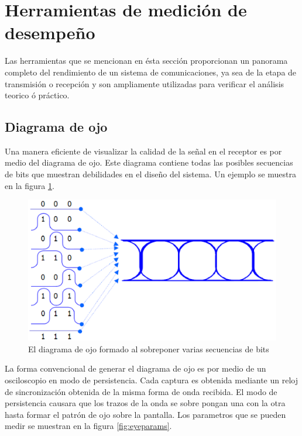 \section{Herramientas de medici\'on de desempe\~no}
Las herramientas que se mencionan en \'esta secci\'on proporcionan un panorama completo del
rendimiento de un sistema de comunicaciones, ya sea de la etapa de transmisi\'on o recepci\'on y
son ampliamente utilizadas para verificar el an\'alisis teorico \'o pr\'actico.

\subsection{Diagrama de ojo}
Una manera eficiente de visualizar la calidad de la se\~nal en el receptor es por medio del diagrama
de ojo. Este diagrama contiene todas las posibles secuencias de bits que muestran debilidades en el
dise\~no del sistema. Un ejemplo se muestra en la figura \ref{fig:eyeform}\cite{foster}.

\begin{figure}[htp]
\centering
	\includegraphics[width=5.5in]{figs/eyeform}
	\caption{El diagrama de ojo formado al sobreponer varias secuencias de bits}
	\label{fig:eyeform}
\end{figure}

La forma convencional de generar el diagrama de ojo es por medio de un osciloscopio en modo de
persistencia. Cada captura es obtenida mediante un reloj de sincronizaci\'on obtenida de la misma
forma de onda recibida. El modo de persistencia causara que los trazos de la onda se sobre pongan
una con la otra hasta formar el patr\'on de ojo sobre la pantalla. Los parametros que se pueden
medir se muestran en la figura \ref{fig:eyeparams}\cite{breed}.

